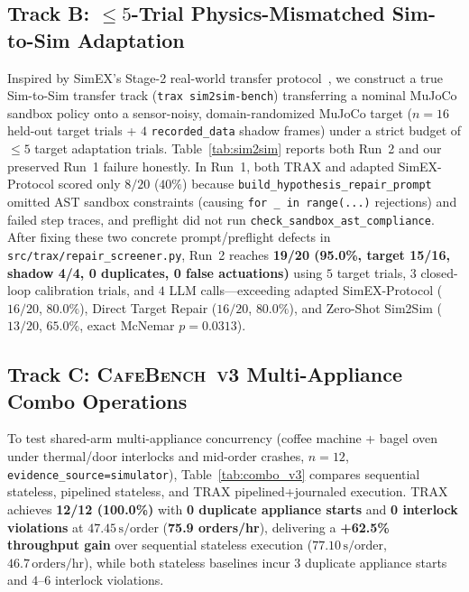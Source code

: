 \documentclass{trax}
\begin{document}
\begin{table}[t]
\centering
\caption{\textsc{CafeBench~v2} held-out results ($n{=}30$: $26$ \texttt{simulator} + $4$ \texttt{recorded\_data}, matched \texttt{gpt-6-astra}).}
\label{tab:cafebench_v2}
\small

\end{table}

\subsection{Track B: $\le 5$-Trial Physics-Mismatched Sim-to-Sim Adaptation}
Inspired by SimEX's Stage-2 real-world transfer protocol~\cite{hu2026simex}, we construct a true Sim-to-Sim transfer track (\texttt{trax sim2sim-bench}) transferring a nominal MuJoCo sandbox policy onto a sensor-noisy, domain-randomized MuJoCo target ($n{=}16$ held-out target trials + $4$ \texttt{recorded\_data} shadow frames) under a strict budget of $\le 5$ target adaptation trials. Table~\ref{tab:sim2sim} reports both Run~2 and our preserved Run~1 failure honestly. In Run~1, both TRAX and adapted SimEX-Protocol scored only $8/20$ ($40\%$) because \texttt{build\_hypothesis\_repair\_prompt} omitted AST sandbox constraints (causing \texttt{for \_ in range(...)} rejections) and failed step traces, and preflight did not run \texttt{check\_sandbox\_ast\_compliance}. After fixing these two concrete prompt/preflight defects in \texttt{src/trax/repair\_screener.py}, Run~2 reaches \textbf{19/20 (95.0\%, target 15/16, shadow 4/4, 0 duplicates, 0 false actuations)} using $5$ target trials, $3$ closed-loop calibration trials, and $4$ LLM calls---exceeding adapted SimEX-Protocol ($16/20$, $80.0\%$), Direct Target Repair ($16/20$, $80.0\%$), and Zero-Shot Sim2Sim ($13/20$, $65.0\%$, exact McNemar $p{=}0.0313$).

\begin{table}[t]
\centering
\caption{Sim-to-Sim Stage-2 adaptation ($\le 5$ target trials, \texttt{simulator} + \texttt{recorded\_data}). Run~1 preserved honestly.}
\label{tab:sim2sim}
\small

\end{table}

\subsection{Track C: \textsc{CafeBench~v3} Multi-Appliance Combo Operations}
To test shared-arm multi-appliance concurrency (coffee machine + bagel oven under thermal/door interlocks and mid-order crashes, $n{=}12$, \texttt{evidence\_source=simulator}), Table~\ref{tab:combo_v3} compares sequential stateless, pipelined stateless, and TRAX pipelined+journaled execution. TRAX achieves \textbf{12/12 (100.0\%)} with \textbf{0 duplicate appliance starts} and \textbf{0 interlock violations} at $47.45\,\mathrm{s}/\text{order}$ (\textbf{75.9 orders/hr}), delivering a \textbf{+62.5\% throughput gain} over sequential stateless execution ($77.10\,\mathrm{s}/\text{order}$, $46.7\,\text{orders/hr}$), while both stateless baselines incur $3$ duplicate appliance starts and $4$--$6$ interlock violations.
\end{document}
